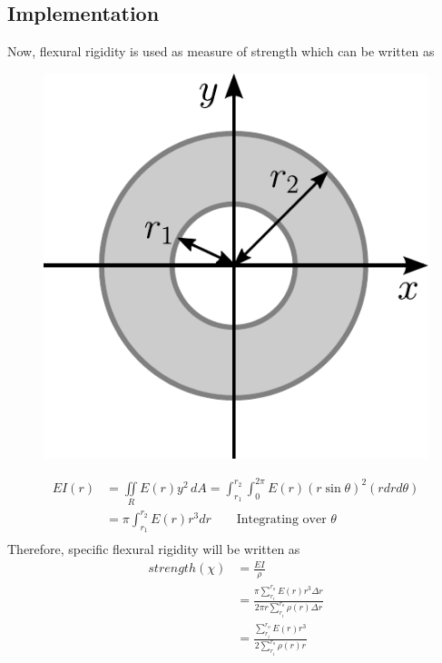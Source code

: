 \documentclass[10pt]{article}
\begin{document}
\subsection{Implementation}
Now, flexural rigidity is used as measure of strength which can be written as 
\begin{figure}
\includegraphics[scale=0.3]{moment_annulus}
\end{figure}
\begin{equation}
\begin{split}
EI(r) &= \underset{R}{\iint}E(r)y^2\,dA = \int_{r_1}^{r_2}\int_0^{2\pi} E(r)(r\sin\theta)^2(rdrd\theta)\\
&= \pi\int_{r_1}^{r_2} E(r)r^3 dr \qquad \text{Integrating over $\theta$}\\
\end{split}
\end{equation}
Therefore, specific flexural rigidity will be written as
\begin{equation}\label{objective_eb}
\begin{split}
strength(\chi) &=\frac{EI}{\rho}\\
&=\frac{\pi\sum^{r_o}_{r_i}E(r)r^3\Delta r}{2\pi r\sum^{r_o}_{r_i}\rho(r)\Delta r}\\
&=\frac{\sum^{r_o}_{r_i}E(r)r^3}{2 \sum^{r_o}_{r_i}\rho(r)r}
\end{split}
\end{equation}
\end{document}
